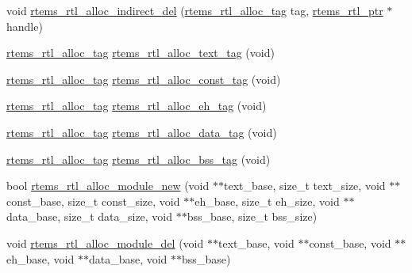 \begin{DoxyCompactItemize}
\item 
void \mbox{\hyperlink{rtl-allocator_8h_ad8518f137454a1a316fc21d335af10c9}{rtems\+\_\+rtl\+\_\+alloc\+\_\+indirect\+\_\+del}} (\mbox{\hyperlink{rtl-allocator_8h_a445a8615118b7fc14005ab20583153fd}{rtems\+\_\+rtl\+\_\+alloc\+\_\+tag}} tag, \mbox{\hyperlink{structrtems__rtl__ptr}{rtems\+\_\+rtl\+\_\+ptr}} $\ast$handle)
\item 
\mbox{\hyperlink{rtl-allocator_8h_a445a8615118b7fc14005ab20583153fd}{rtems\+\_\+rtl\+\_\+alloc\+\_\+tag}} \mbox{\hyperlink{rtl-allocator_8h_a10334f8df36a4017c69daf53e59baa79}{rtems\+\_\+rtl\+\_\+alloc\+\_\+text\+\_\+tag}} (void)
\item 
\mbox{\hyperlink{rtl-allocator_8h_a445a8615118b7fc14005ab20583153fd}{rtems\+\_\+rtl\+\_\+alloc\+\_\+tag}} \mbox{\hyperlink{rtl-allocator_8h_ac94530ff626eb651e97d142b635e161e}{rtems\+\_\+rtl\+\_\+alloc\+\_\+const\+\_\+tag}} (void)
\item 
\mbox{\hyperlink{rtl-allocator_8h_a445a8615118b7fc14005ab20583153fd}{rtems\+\_\+rtl\+\_\+alloc\+\_\+tag}} \mbox{\hyperlink{rtl-allocator_8h_ac03f273707eb55ed34a1ebcee8fd4a10}{rtems\+\_\+rtl\+\_\+alloc\+\_\+eh\+\_\+tag}} (void)
\item 
\mbox{\hyperlink{rtl-allocator_8h_a445a8615118b7fc14005ab20583153fd}{rtems\+\_\+rtl\+\_\+alloc\+\_\+tag}} \mbox{\hyperlink{rtl-allocator_8h_aac71a304eb90c1c400a3c5113506219a}{rtems\+\_\+rtl\+\_\+alloc\+\_\+data\+\_\+tag}} (void)
\item 
\mbox{\hyperlink{rtl-allocator_8h_a445a8615118b7fc14005ab20583153fd}{rtems\+\_\+rtl\+\_\+alloc\+\_\+tag}} \mbox{\hyperlink{rtl-allocator_8h_a031e1d00b848c1d533d292c60fabd10d}{rtems\+\_\+rtl\+\_\+alloc\+\_\+bss\+\_\+tag}} (void)
\item 
bool \mbox{\hyperlink{rtl-allocator_8h_acb2d42b308fc906eadc8adabfda71b70}{rtems\+\_\+rtl\+\_\+alloc\+\_\+module\+\_\+new}} (void $\ast$$\ast$text\+\_\+base, size\+\_\+t text\+\_\+size, void $\ast$$\ast$const\+\_\+base, size\+\_\+t const\+\_\+size, void $\ast$$\ast$eh\+\_\+base, size\+\_\+t eh\+\_\+size, void $\ast$$\ast$data\+\_\+base, size\+\_\+t data\+\_\+size, void $\ast$$\ast$bss\+\_\+base, size\+\_\+t bss\+\_\+size)
\item 
void \mbox{\hyperlink{rtl-allocator_8h_a718eab4a84e05b311c40633cd0f793e5}{rtems\+\_\+rtl\+\_\+alloc\+\_\+module\+\_\+del}} (void $\ast$$\ast$text\+\_\+base, void $\ast$$\ast$const\+\_\+base, void $\ast$$\ast$eh\+\_\+base, void $\ast$$\ast$data\+\_\+base, void $\ast$$\ast$bss\+\_\+base)
\end{DoxyCompactItemize}


